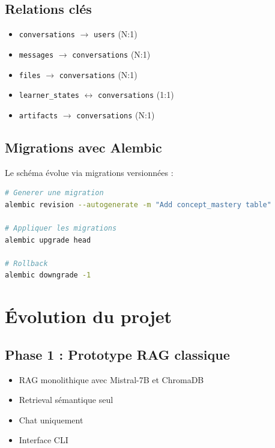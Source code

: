 \documentclass[12pt,a4paper]{article}
\begin{document}
\subsection{Relations clés}

\begin{itemize}
    \item \texttt{conversations} $\rightarrow$ \texttt{users} (N:1)
    \item \texttt{messages} $\rightarrow$ \texttt{conversations} (N:1)
    \item \texttt{files} $\rightarrow$ \texttt{conversations} (N:1)
    \item \texttt{learner\_states} $\leftrightarrow$ \texttt{conversations} (1:1)
    \item \texttt{artifacts} $\rightarrow$ \texttt{conversations} (N:1)
\end{itemize}

\subsection{Migrations avec Alembic}

Le schéma évolue via migrations versionnées :

\begin{lstlisting}[language=bash]
# Generer une migration
alembic revision --autogenerate -m "Add concept_mastery table"

# Appliquer les migrations
alembic upgrade head

# Rollback
alembic downgrade -1
\end{lstlisting}

\section{Évolution du projet}

\subsection{Phase 1 : Prototype RAG classique}

\begin{itemize}
    \item RAG monolithique avec Mistral-7B et ChromaDB
    \item Retrieval sémantique seul
    \item Chat uniquement
    \item Interface CLI
\end{itemize}
\end{document}

